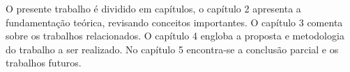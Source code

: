 O presente trabalho é dividido em capítulos, o capítulo 2 apresenta a fundamentação teórica, revisando conceitos importantes. O capítulo 3 comenta sobre os trabalhos relacionados. O capítulo 4 engloba a proposta e metodologia do trabalho a ser realizado. No capítulo 5 encontra-se a conclusão parcial e os trabalhos futuros.

